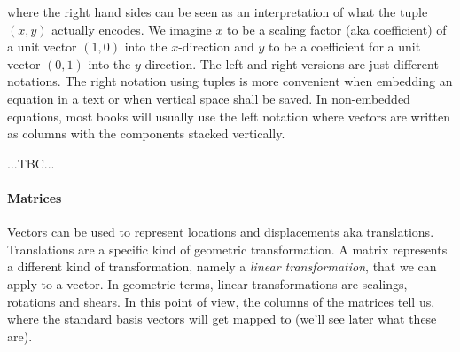 where the right hand sides can be seen as an interpretation of what the tuple $(x,y)$ actually encodes. We imagine $x$ to be a scaling factor (aka coefficient) of a unit vector $(1,0)$ into the $x$-direction and $y$ to be a coefficient for a unit vector $(0,1)$ into the $y$-direction. The left and right versions are just different notations. The right notation using tuples is more convenient when embedding an equation in a text or when vertical space shall be saved. In non-embedded equations, most books will usually use the left notation where vectors are written as columns with the components stacked vertically. 




...TBC...






\paragraph{Matrices}
Vectors can be used to represent locations and displacements aka translations. Translations are a specific kind of geometric transformation. A matrix represents a different kind of transformation, namely a \emph{linear transformation}, that we can apply to a vector. In geometric terms, linear transformations are scalings, rotations and shears. In this point of view, the columns of the matrices tell us, where the standard basis vectors will get mapped to (we'll see later what these are).

